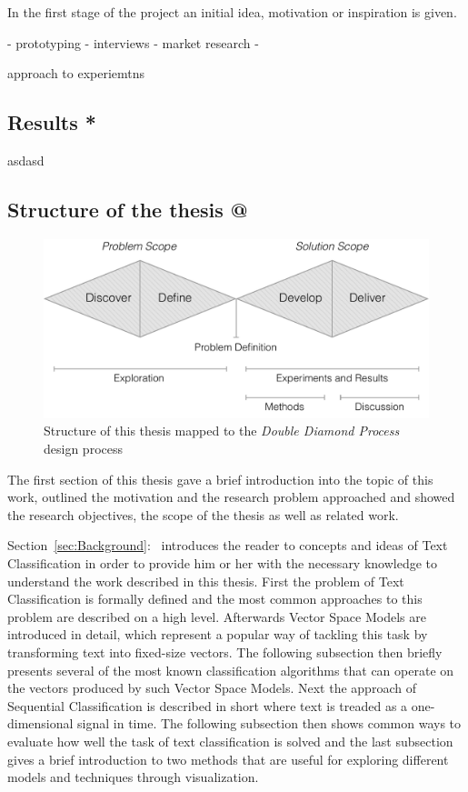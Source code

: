 In the first stage of the project an initial idea, motivation or inspiration is given.

- prototyping
- interviews
- market research
-

approach to experiemtns 



\subsection{Results *}

asdasd

\subsection{Structure of the thesis @}

\begin{figure}[h]
    \centering
    \includegraphics[width=\textwidth]{img/double-diamond-with-structure}
    \caption{Structure of this thesis mapped to the \emph{Double Diamond Process} design process }
\label{fig:double-diamond-with-structure}
\end{figure}

The first section of this thesis gave a brief introduction into the topic of this work, outlined the motivation and the research problem approached and showed the research objectives, the scope of the thesis as well as related work.

Section~\ref{sec:Background}:~ introduces the reader to concepts and ideas of Text Classification in order to provide him or her with the necessary knowledge to understand the work described in this thesis. First the problem of Text Classification is formally defined and the most common approaches to this problem are described on a high level. Afterwards Vector Space Models are introduced in detail, which represent a popular way of tackling this task by transforming text into fixed-size vectors.
The following subsection then briefly presents several of the most known classification algorithms that can operate on the vectors produced by such Vector Space Models. Next the approach of Sequential Classification is described in short where text is treaded as a one-dimensional signal in time. The following subsection then shows common ways to evaluate how well the task of text classification is solved and the last subsection gives a brief introduction to two methods that are useful for exploring different models and techniques through visualization.

